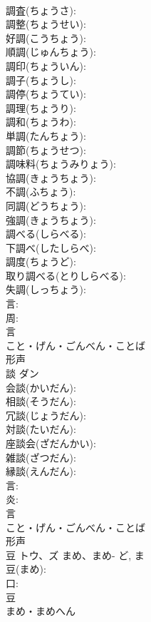 \documentclass[8pt]{extreport}
\begin{document}
\begin{CJK}{UTF8}{min}
\\	調査(ちょうさ): 
\\	調整(ちょうせい): 
\\	好調(こうちょう): 
\\	順調(じゅんちょう): 
\\	調印(ちょういん): 
\\	調子(ちょうし): 
\\	調停(ちょうてい): 
\\	調理(ちょうり): 
\\	調和(ちょうわ): 
\\	単調(たんちょう): 
\\	調節(ちょうせつ): 
\\	調味料(ちょうみりょう): 
\\	協調(きょうちょう): 
\\	不調(ふちょう): 
\\	同調(どうちょう): 
\\	強調(きょうちょう): 
\\	調べる(しらべる): 
\\	下調べ(したしらべ): 
\\	調度(ちょうど): 
\\	取り調べる(とりしらべる): 
\\	失調(しっちょう): 
\\	言: 
\\	周: 
\\	言	
\\	こと・げん・ごんべん・ことば	
\\	形声 
\\	談	ダン			
\\	会談(かいだん): 
\\	相談(そうだん): 
\\	冗談(じょうだん): 
\\	対談(たいだん): 
\\	座談会(ざだんかい): 
\\	雑談(ざつだん): 
\\	縁談(えんだん): 
\\	言: 
\\	炎: 
\\	言	
\\	こと・げん・ごんべん・ことば	
\\	形声 
\\	豆	トウ、ズ	まめ、まめ-	ど, ま	
\\	豆(まめ): 
\\	口: 
\\	豆	
\\	まめ・まめへん	

\end{CJK}
\end{document}
